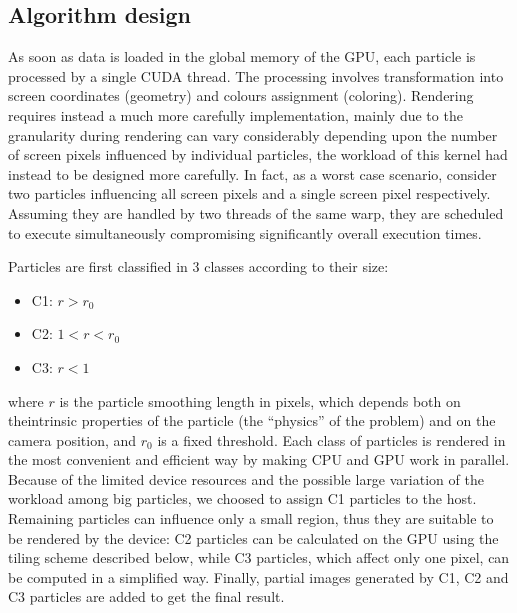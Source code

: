 \documentclass[11pt]{article}
\begin{document}
\subsection{Algorithm design}


As soon as data is loaded in the global memory of the GPU, each particle is processed by a single CUDA thread. The processing involves transformation into screen coordinates (geometry) and colours assignment (coloring).
Rendering requires instead a much more carefully implementation, mainly due to 
the granularity during rendering can vary considerably depending upon the number of screen pixels influenced by individual particles, the workload of this kernel had instead to be designed more carefully.
In fact, as a worst case scenario, consider two particles influencing all screen pixels and a single screen pixel
respectively. Assuming they are handled by two threads of the same warp, they are scheduled to execute simultaneously compromising significantly overall execution times.

Particles are first classified in 3 classes according to their size:
\begin{itemize}
\item 
C1: $r > r_0$
\item
C2: $1 < r < r_0$
\item
C3: $r < 1$
\end{itemize}
where $r$ is the particle smoothing length in pixels, which depends both on theintrinsic properties of the particle (the ``physics'' of the problem) and on the camera position, and $r_0$ is a fixed threshold. Each class of particles is rendered in the most convenient and efficient way by making CPU and GPU work in parallel. Because of the limited device resources and the possible large variation of the workload among big particles, we choosed to assign C1 particles to the host. Remaining particles can influence only a small region, thus they are suitable to be rendered by the device: C2 particles can be calculated on the GPU using the tiling scheme described below, while C3 particles, which affect only one pixel, can be computed in a simplified way. Finally, partial images generated by C1, C2 and C3 particles are added to get the final result. 
\end{document}
